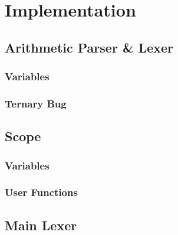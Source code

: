 \chapter{Implementation}




\section{Arithmetic Parser \& Lexer}

\subsection{Variables}
\subsection{Ternary Bug}

\section{Scope}

\subsection{Variables}
\subsection{User Functions}

\section{Main Lexer}

